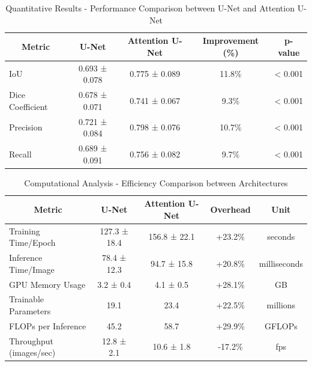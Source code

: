 \documentclass[Journal,letterpaper]{ascelike-new}
\begin{document}
\begin{table}[htbp]
\caption{Quantitative Results - Performance Comparison between U-Net and Attention U-Net}
\label{tab:quantitative_results}
\centering
\small
\renewcommand{\arraystretch}{1.25}
\begin{tabular}{l c c c c}
\hline\hline
\multicolumn{1}{c}{\textbf{Metric}} & 
\multicolumn{1}{c}{\textbf{U-Net}} & 
\multicolumn{1}{c}{\textbf{Attention U-Net}} & 
\multicolumn{1}{c}{\textbf{Improvement (\%)}} & 
\multicolumn{1}{c}{\textbf{p-value}} \\
\hline
IoU & 0.693 ± 0.078 & 0.775 ± 0.089 & 11.8\% & < 0.001 \\
Dice Coefficient & 0.678 ± 0.071 & 0.741 ± 0.067 & 9.3\% & < 0.001 \\
Precision & 0.721 ± 0.084 & 0.798 ± 0.076 & 10.7\% & < 0.001 \\
Recall & 0.689 ± 0.091 & 0.756 ± 0.082 & 9.7\% & < 0.001 \\
\hline\hline
\end{tabular}
\normalsize
\end{table}

\begin{table}[htbp]
\caption{Computational Analysis - Efficiency Comparison between Architectures}
\label{tab:computational_analysis}
\centering
\small
\renewcommand{\arraystretch}{1.25}
\begin{tabular}{l c c c c}
\hline\hline
\multicolumn{1}{c}{\textbf{Metric}} & 
\multicolumn{1}{c}{\textbf{U-Net}} & 
\multicolumn{1}{c}{\textbf{Attention U-Net}} & 
\multicolumn{1}{c}{\textbf{Overhead}} & 
\multicolumn{1}{c}{\textbf{Unit}} \\
\hline
Training Time/Epoch & 127.3 ± 18.4 & 156.8 ± 22.1 & +23.2\% & seconds \\
Inference Time/Image & 78.4 ± 12.3 & 94.7 ± 15.8 & +20.8\% & milliseconds \\
GPU Memory Usage & 3.2 ± 0.4 & 4.1 ± 0.5 & +28.1\% & GB \\
Trainable Parameters & 19.1 & 23.4 & +22.5\% & millions \\
FLOPs per Inference & 45.2 & 58.7 & +29.9\% & GFLOPs \\
Throughput (images/sec) & 12.8 ± 2.1 & 10.6 ± 1.8 & -17.2\% & fps \\
\hline\hline
\end{tabular}
\normalsize
\end{table}
\end{document}

